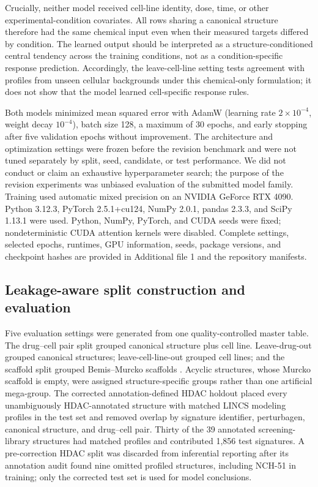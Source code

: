 Crucially, neither model received cell-line identity, dose, time, or other experimental-condition covariates. All rows sharing a canonical structure therefore had the same chemical input even when their measured targets differed by condition. The learned output should be interpreted as a structure-conditioned central tendency across the training conditions, not as a condition-specific response prediction. Accordingly, the leave-cell-line setting tests agreement with profiles from unseen cellular backgrounds under this chemical-only formulation; it does not show that the model learned cell-specific response rules.

Both models minimized mean squared error with AdamW (learning rate $2\times10^{-4}$, weight decay $10^{-4}$), batch size 128, a maximum of 30 epochs, and early stopping after five validation epochs without improvement. The architecture and optimization settings were frozen before the revision benchmark and were not tuned separately by split, seed, candidate, or test performance. We did not conduct or claim an exhaustive hyperparameter search; the purpose of the revision experiments was unbiased evaluation of the submitted model family. Training used automatic mixed precision on an NVIDIA GeForce RTX 4090. Python 3.12.3, PyTorch 2.5.1+cu124, NumPy 2.0.1, pandas 2.3.3, and SciPy 1.13.1 were used. Python, NumPy, PyTorch, and CUDA seeds were fixed; nondeterministic CUDA attention kernels were disabled. Complete settings, selected epochs, runtimes, GPU information, seeds, package versions, and checkpoint hashes are provided in Additional file 1 and the repository manifests.

\subsection{Leakage-aware split construction and evaluation}

Five evaluation settings were generated from one quality-controlled master table. The drug--cell pair split grouped canonical structure plus cell line. Leave-drug-out grouped canonical structures; leave-cell-line-out grouped cell lines; and the scaffold split grouped Bemis--Murcko scaffolds \cite{bemis1996}. Acyclic structures, whose Murcko scaffold is empty, were assigned structure-specific groups rather than one artificial mega-group. The corrected annotation-defined HDAC holdout placed every unambiguously HDAC-annotated structure with matched LINCS modeling profiles in the test set and removed overlap by signature identifier, perturbagen, canonical structure, and drug--cell pair. Thirty of the 39 annotated screening-library structures had matched profiles and contributed 1,856 test signatures. A pre-correction HDAC split was discarded from inferential reporting after its annotation audit found nine omitted profiled structures, including NCH-51 in training; only the corrected test set is used for model conclusions.

